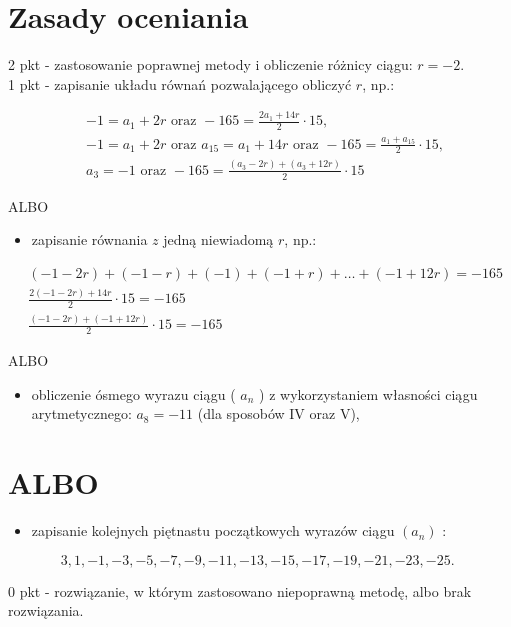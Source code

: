 \documentclass[10pt]{article}
\begin{document}
\section*{Zasady oceniania}
2 pkt - zastosowanie poprawnej metody i obliczenie różnicy ciągu: $r=-2$.\\
1 pkt - zapisanie układu równań pozwalającego obliczyć $r$, np.:

$$
\begin{aligned}
& -1=a_{1}+2 r \text { oraz }-165=\frac{2 a_{1}+14 r}{2} \cdot 15, \\
& -1=a_{1}+2 r \text { oraz } a_{15}=a_{1}+14 r \text { oraz }-165=\frac{a_{1}+a_{15}}{2} \cdot 15, \\
& a_{3}=-1 \text { oraz }-165=\frac{\left(a_{3}-2 r\right)+\left(a_{3}+12 r\right)}{2} \cdot 15
\end{aligned}
$$

ALBO

\begin{itemize}
  \item zapisanie równania $z$ jedną niewiadomą $r$, np.:
\end{itemize}

$$
\begin{aligned}
& (-1-2 r)+(-1-r)+(-1)+(-1+r)+\ldots+(-1+12 r)=-165 \\
& \frac{2(-1-2 r)+14 r}{2} \cdot 15=-165 \\
& \frac{(-1-2 r)+(-1+12 r)}{2} \cdot 15=-165
\end{aligned}
$$

ALBO

\begin{itemize}
  \item obliczenie ósmego wyrazu ciągu ( $a_{n}$ ) z wykorzystaniem własności ciągu arytmetycznego: $a_{8}=-11$ (dla sposobów IV oraz V),
\end{itemize}

\section*{ALBO}
\begin{itemize}
  \item zapisanie kolejnych piętnastu początkowych wyrazów ciągu $\left(a_{n}\right)$ :
\end{itemize}

$$
3,1,-1,-3,-5,-7,-9,-11,-13,-15,-17,-19,-21,-23,-25 \text {. }
$$

0 pkt - rozwiązanie, w którym zastosowano niepoprawną metodę, albo brak rozwiązania.
\end{document}
